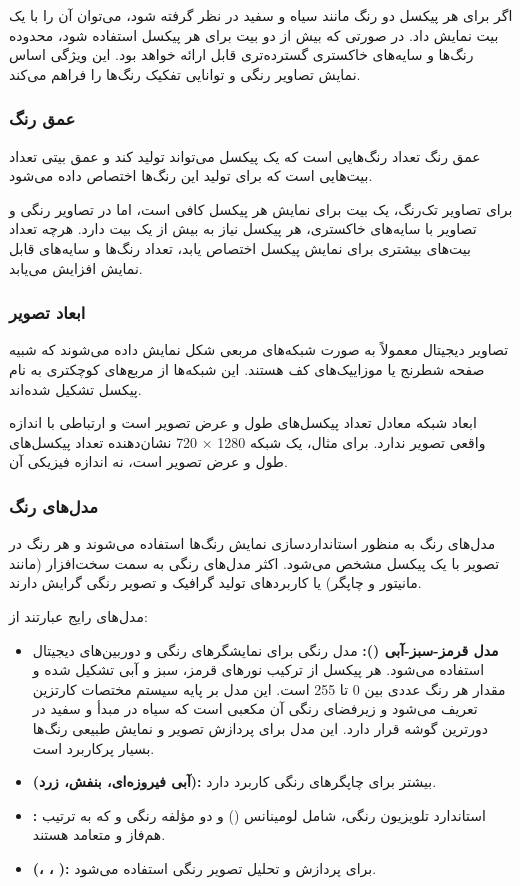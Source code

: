 اگر برای هر پیکسل دو رنگ مانند سیاه و سفید در نظر گرفته شود، می‌توان آن را با یک بیت نمایش داد. در صورتی که بیش از دو بیت برای هر پیکسل استفاده شود، محدوده رنگ‌ها و سایه‌های خاکستری گسترده‌تری قابل ارائه خواهد بود. این ویژگی اساس نمایش تصاویر رنگی و توانایی تفکیک رنگ‌ها را فراهم می‌کند.

\subsubsection{عمق رنگ}
عمق رنگ تعداد رنگ‌هایی است که یک پیکسل می‌تواند تولید کند و عمق بیتی تعداد بیت‌هایی است که برای تولید این رنگ‌ها اختصاص داده می‌شود.

برای تصاویر تک‌رنگ، یک بیت برای نمایش هر پیکسل کافی است، اما در تصاویر رنگی و تصاویر با سایه‌های خاکستری، هر پیکسل نیاز به بیش از یک بیت دارد. هرچه تعداد بیت‌های بیشتری برای نمایش پیکسل اختصاص یابد، تعداد رنگ‌ها و سایه‌های قابل نمایش افزایش می‌یابد.

\subsubsection{ابعاد تصویر}
تصاویر دیجیتال معمولاً به صورت شبکه‌های مربعی شکل نمایش داده می‌شوند که شبیه صفحه شطرنج یا موزاییک‌های کف هستند\cite{ref48}. این شبکه‌ها از مربع‌های کوچکتری به نام پیکسل تشکیل شده‌اند.

ابعاد شبکه معادل تعداد پیکسل‌های طول و عرض تصویر است و ارتباطی با اندازه واقعی تصویر ندارد. برای مثال، یک شبکه 1280 × 720 نشان‌دهنده تعداد پیکسل‌های طول و عرض تصویر است، نه اندازه فیزیکی آن.

\subsubsection{مدل‌های رنگ}
مدل‌های رنگ به منظور استانداردسازی نمایش رنگ‌ها استفاده می‌شوند و هر رنگ در تصویر با یک پیکسل مشخص می‌شود\cite{ref49}. اکثر مدل‌های رنگی به سمت سخت‌افزار (مانند مانیتور و چاپگر) یا کاربردهای تولید گرافیک و تصویر رنگی گرایش دارند.

مدل‌های رایج عبارتند از:
\begin{itemize}
    \item \textbf{مدل قرمز-سبز-آبی ():} مدل رنگی  برای نمایشگرهای رنگی و دوربین‌های دیجیتال استفاده می‌شود. هر پیکسل از ترکیب نورهای قرمز، سبز و آبی تشکیل شده و مقدار هر رنگ عددی بین 0 تا 255 است. این مدل بر پایه سیستم مختصات کارتزین تعریف می‌شود و زیرفضای رنگی آن مکعبی است که سیاه در مبدأ و سفید در دورترین گوشه قرار دارد. این مدل برای پردازش تصویر و نمایش طبیعی رنگ‌ها بسیار پرکاربرد است.
    \item \textbf{ (آبی فیروزه‌ای، بنفش، زرد):} بیشتر برای چاپگرهای رنگی کاربرد دارد.
    \item \textbf{:} استاندارد تلویزیون رنگی، شامل لومینانس () و دو مؤلفه رنگی  و  که به ترتیب هم‌فاز و متعامد هستند.
    \item \textbf{ (، ، ):} برای پردازش و تحلیل تصویر رنگی استفاده می‌شود.
\end{itemize}

